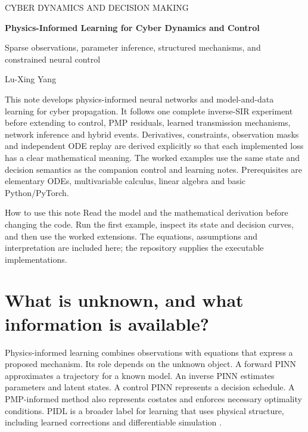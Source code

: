 \documentclass[11pt,a4paper]{article}
\theoremstyle{definition}
\theoremstyle{remark}
\begin{document}
\thispagestyle{plain}
{\color{inkblue}\sffamily\small CYBER DYNAMICS AND DECISION MAKING}\par
\vspace{1.0cm}
{\huge\bfseries Physics-Informed Learning for Cyber Dynamics and Control}\par
\vspace{0.35cm}
{\Large Sparse observations, parameter inference, structured mechanisms, and constrained neural control}\par
\vspace{0.45cm}
{\large Lu-Xing Yang}\par
\vspace{0.7cm}
This note develops physics-informed neural networks and model-and-data learning for cyber propagation. It follows one complete inverse-SIR experiment before extending to control, PMP residuals, learned transmission mechanisms, network inference and hybrid events. Derivatives, constraints, observation masks and independent ODE replay are derived explicitly so that each implemented loss has a clear mathematical meaning. The worked examples use the same state and decision semantics as the companion control and learning notes. Prerequisites are elementary ODEs, multivariable calculus, linear algebra and basic Python/PyTorch.
\vspace{0.5cm}
\begin{keyidea}{How to use this note}
Read the model and the mathematical derivation before changing the code. Run the first example, inspect its state and decision curves, and then use the worked extensions. The equations, assumptions and interpretation are included here; the repository supplies the executable implementations.
\end{keyidea}
\clearpage
\begingroup\setlength{\parskip}{0pt}\footnotesize\linespread{0.90}\selectfont\tableofcontents\endgroup
\clearpage

\section{What is unknown, and what information is available?}
Physics-informed learning combines observations with equations that express a proposed mechanism. Its role depends on the unknown object. A forward PINN approximates a trajectory for a known model. An inverse PINN estimates parameters and latent states. A control PINN represents a decision schedule. A PMP-informed method also represents costates and enforces necessary optimality conditions. PIDL is a broader label for learning that uses physical structure, including learned corrections and differentiable simulation \cite{raissi,karniadakis}.
\end{document}
